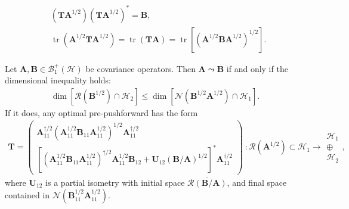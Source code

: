 \documentclass[10pt,a4paper]{amsart}
\DeclareMathOperator*{\tr}{tr}
\newcommand{\m}[1]{\mathbf{#1}} %
\renewcommand{\c}[1]{\mathcal{#1}} %
\begin{document}
\begin{align}
    &(\m{T} \m{A}^{1/2}) (\m{T} \m{A}^{1/2})^{*} = \m{B}, \label{eq:cond:ricatti} \\ 
    &\tr (\m{A}^{1/2} \m{T} \m{A}^{1/2}) = \tr (\m{T} \m{A}) = \tr [(\m{A}^{1/2} \m{B} \m{A}^{1/2})^{1/2}]. \label{eq:cond2:opt}
\end{align}

\begin{theorem}\label{thm:sol:sym:inf}
Let $\m{A}, \m{B} \in \c{B}_{1}^{+}(\c{H})$ be covariance operators.
Then $\m{A} \leadsto \m{B}$ if and only if the dimensional inequality holds:
\begin{align*}
    \dim [\c{R}(\m{B}^{1/2}) \cap \c{H}_{2}] \le \dim [\c{N}(\m{B}^{1/2} \m{A}^{1/2}) \cap \c{H}_{1}].
\end{align*}
If it does, any optimal pre-pushforward has the form
\begin{align}\label{eq:sol:set}
    \m{T} = 
    \begin{pmatrix}
    \m{A}_{11}^{\dagger/2} (\m{A}_{11}^{1/2} \m{B}_{11} \m{A}_{11}^{1/2})^{1/2} \m{A}_{11}^{\dagger/2} \\
    [(\m{A}_{11}^{1/2} \m{B}_{11} \m{A}_{11}^{1/2})^{\dagger/2} \m{A}_{11}^{1/2} \m{B}_{12} + \m{U}_{12} (\m{B}/\m{A})^{1/2}]^{*} \m{A}_{11}^{\dagger/2}
    \end{pmatrix}
    \    :
    \c{R}(\m{A}^{1/2}) \subset \c{H}_{1}
    \rightarrow
    \begin{array}{c}
    \c{H}_{1} \\
    \oplus \\
    \c{H}_{2}
    \end{array},
\end{align}
where $\m{U}_{12}$ is a partial isometry with initial space $\overline{\c{R}(\m{B}/\m{A})}$, and final space contained in $\c{N}(\m{B}_{11}^{1/2} \m{A}_{11}^{1/2})$.
\end{theorem}
\end{document}
